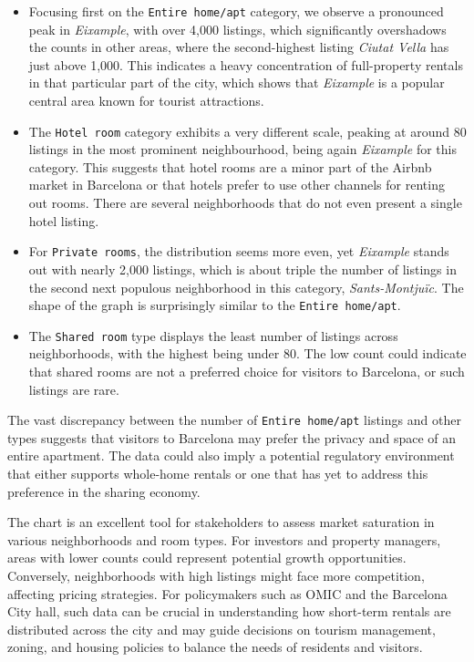 \documentclass[
]{article}
\begin{document}
\begin{itemize}
\item
  Focusing first on the \texttt{Entire\ home/apt} category, we observe a
  pronounced peak in \emph{Eixample}, with over 4,000 listings, which
  significantly overshadows the counts in other areas, where the
  second-highest listing \emph{Ciutat Vella} has just above 1,000. This
  indicates a heavy concentration of full-property rentals in that
  particular part of the city, which shows that \emph{Eixample} is a
  popular central area known for tourist attractions.
\item
  The \texttt{Hotel\ room} category exhibits a very different scale,
  peaking at around 80 listings in the most prominent neighbourhood,
  being again \emph{Eixample} for this category. This suggests that
  hotel rooms are a minor part of the Airbnb market in Barcelona or that
  hotels prefer to use other channels for renting out rooms. There are
  several neighborhoods that do not even present a single hotel listing.
\item
  For \texttt{Private\ rooms}, the distribution seems more even, yet
  \emph{Eixample} stands out with nearly 2,000 listings, which is about
  triple the number of listings in the second next populous neighborhood
  in this category, \emph{Sants-Montjuïc}. The shape of the graph is
  surprisingly similar to the \texttt{Entire\ home/apt}.
\item
  The \texttt{Shared\ room} type displays the least number of listings
  across neighborhoods, with the highest being under 80. The low count
  could indicate that shared rooms are not a preferred choice for
  visitors to Barcelona, or such listings are rare.
\end{itemize}

The vast discrepancy between the number of \texttt{Entire\ home/apt}
listings and other types suggests that visitors to Barcelona may prefer
the privacy and space of an entire apartment. The data could also imply
a potential regulatory environment that either supports whole-home
rentals or one that has yet to address this preference in the sharing
economy.

The chart is an excellent tool for stakeholders to assess market
saturation in various neighborhoods and room types. For investors and
property managers, areas with lower counts could represent potential
growth opportunities. Conversely, neighborhoods with high listings might
face more competition, affecting pricing strategies. For policymakers
such as OMIC and the Barcelona City hall, such data can be crucial in
understanding how short-term rentals are distributed across the city and
may guide decisions on tourism management, zoning, and housing policies
to balance the needs of residents and visitors.
\end{document}
